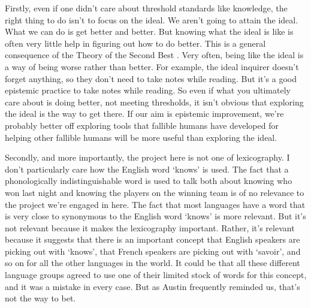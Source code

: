 \documentclass[
  11pt,
]{book}
\begin{document}
Firstly, even if one didn't care about threshold standards like knowledge, the right thing to do isn't to focus on the ideal. We aren't going to attain the ideal. What we can do is get better and better. But knowing what the ideal is like is often very little help in figuring out how to do better. This is a general consequence of the Theory of the Second Best \citep{LipseyLancaster}. Very often, being like the ideal is a way of being worse rather than better. For example, the ideal inquirer doesn't forget anything, so they don't need to take notes while reading. But it's a good epistemic practice to take notes while reading. So even if what you ultimately care about is doing better, not meeting thresholds, it isn't obvious that exploring the ideal is the way to get there. If our aim is epistemic improvement, we're probably better off exploring tools that fallible humans have developed for helping other fallible humans will be more useful than exploring the ideal.

Secondly, and more importantly, the project here is not one of lexicography. I don't particularly care how the English word `knows' is used. The fact that a phonologically indistinguishable word is used to talk both about knowing who won last night and knowing the players on the winning team is of no relevance to the project we're engaged in here. The fact that most languages have a word that is very close to synonymous to the English word `knows' is more relevant. But it's not relevant because it makes the lexicography important. Rather, it's relevant because it suggests that there is an important concept that English speakers are picking out with `knows', that French speakers are picking out with `savoir', and so on for all the other languages in the world. It could be that all these different language groups agreed to use one of their limited stock of words for this concept, and it was a mistake in every case. But as Austin frequently reminded us, that's not the way to bet.
\end{document}
